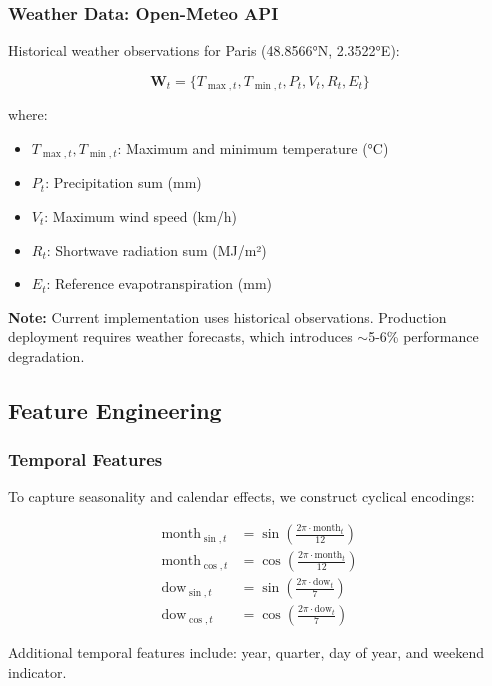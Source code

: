 \documentclass[11pt,a4paper]{article}
\begin{document}
\subsubsection{Weather Data: Open-Meteo API}

Historical weather observations for Paris (48.8566°N, 2.3522°E):

\begin{equation}
\mathbf{W}_t = \{T_{\max,t}, T_{\min,t}, P_t, V_t, R_t, E_t\}
\end{equation}

where:
\begin{itemize}
    \item $T_{\max,t}, T_{\min,t}$: Maximum and minimum temperature (°C)
    \item $P_t$: Precipitation sum (mm)
    \item $V_t$: Maximum wind speed (km/h)
    \item $R_t$: Shortwave radiation sum (MJ/m²)
    \item $E_t$: Reference evapotranspiration (mm)
\end{itemize}

\textbf{Note:} Current implementation uses historical observations. Production deployment requires weather forecasts, which introduces $\sim$5-6\% performance degradation.

\subsection{Feature Engineering}

\subsubsection{Temporal Features}

To capture seasonality and calendar effects, we construct cyclical encodings:

\begin{align}
\text{month}_{\sin,t} &= \sin\left(\frac{2\pi \cdot \text{month}_t}{12}\right) \\
\text{month}_{\cos,t} &= \cos\left(\frac{2\pi \cdot \text{month}_t}{12}\right) \\
\text{dow}_{\sin,t} &= \sin\left(\frac{2\pi \cdot \text{dow}_t}{7}\right) \\
\text{dow}_{\cos,t} &= \cos\left(\frac{2\pi \cdot \text{dow}_t}{7}\right)
\end{align}

Additional temporal features include: year, quarter, day of year, and weekend indicator.
\end{document}
